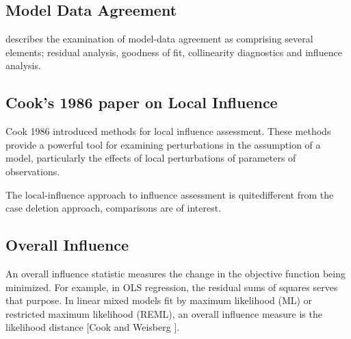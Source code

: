 \documentclass[12pt, a4paper]{article}
\begin{document}
\subsection{Model Data Agreement} %
\citet{schabenberger} describes the examination of model-data agreement as comprising several elements; residual analysis, goodness of fit, collinearity diagnostics and influence analysis.
	


\subsection{Cook's 1986 paper on Local Influence}%
Cook 1986 introduced methods for local influence assessment. These methods provide a powerful tool for examining perturbations in the assumption of a model, particularly the effects of local perturbations of parameters of observations.


The local-influence approach to influence assessment is quitedifferent from the case deletion approach, comparisons are of
interest.








\subsection{Overall Influence}
An overall influence statistic measures the change in the objective function being minimized. For example, in
OLS regression, the residual sums of squares serves that purpose. In linear mixed models fit by
 maximum likelihood (ML) or  restricted maximum likelihood (REML), an overall influence measure is the  likelihood distance [Cook and Weisberg ].





\end{document}
